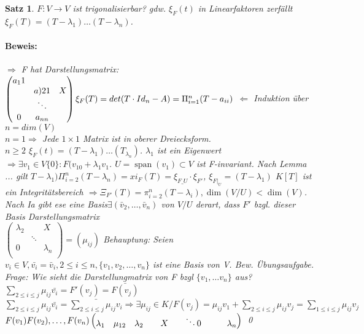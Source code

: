 \documentclass{report}
\newcommand{\lb}{\lambda}
\DeclareMathOperator{\Span}{span}
\theoremstyle{customrem}
\theoremstyle{customdef}
\newtheorem{satz}[definition]{Satz}
\renewenvironment{proof}{\paragraph{Beweis: }}{\qed}
\theoremstyle{customenv}
\begin{document}
\begin{satz}
  \(F : V \to V\) ist trigonalisierbar? gdw. \(\xi_F(t)\) in
  Linearfaktoren zerf\"allt \(\xi_F(T) = (T - \lb_1) \dots (T - \lb_n)\).
  
  \begin{proof}
    \(\Rightarrow\)
    F hat Darstellungsmatrix:\\
    \(
    \begin{pmatrix}
      a_11\\
           & a){21} & X\\
                    & \ddots\\
         0                     & a_{nn}\\
         
    \end{pmatrix}\\
    \xi_F(T) = det(T \cdot Id_n - A) = \Pi_{i=1}^n (T - a_{ii})
    \)
    \(\Leftarrow\)
    Induktion \"uber \(n = dim(V)\)\\
    \(n=1 \Rightarrow \) Jede \(1 \times 1\) Matrix ist in oberer Dreiecksform.\\
    \(n \ge 2\)  \(\xi_F(t) = (T - \lb_1) \dots (T_{\lb_n})\). \(\lb_1\) ist ein
    Eigenwert \( \Rightarrow \exists v_1 \in V\{0\} : F(v_10 + \lb_1 v_1\).
    \(U = \Span(v_1) \subset V\)  ist F-invariant. Nach Lemma ... gilt
    \(T - \lb_1) \Pi_{i=2}^n(T - \lb_n) = xi_F(T) = \xi_{F\_U} \cdot \xi_{F'}\), \(\xi_{F|_U} = (T - \lb_1)\)
    \(K[T]\) ist ein Integrit\"atsbereich \(\Rightarrow
    \Xi_{F'}(T) = \pi_{i=2}^n (T-\lb_i), \dim(V/U) < \dim(V)\).\\
    Nach Ia gibt ese eine Basis\(\exists (\bar{v}_2, \dots, \bar{v}_n)\) von
    \(V/U\) derart, dass \(F'\) bzgl. dieser Basis Darstellungsmatrix\\
    \(
    \begin{pmatrix}
      \lb_2 &        & X\\
            & \ddots &\\
      0     &        & \lb_n\\
    \end{pmatrix} = (\mu_{ij})
    \)
    Behauptung: Seien \(v_i \in V, \bar{v_i} = \bar{v}_i, 2 \le i \le n, \{v_1, v_2, \dots, v_n\}\) ist eine
    Basis von V. Bew. \"Ubungsaufgabe.\\
    Frage: Wie sieht die Darstellungmatrix von F bzgl \(\{v_1, \dots v_n\}\)
    aus?\\
    \(\sum_{2\le i \le j} \mu_{ij} \bar{v_i} = F'(v_j) = \bar{F(v_j)}\)\\
    \(\sum_{2\le i \le j} \mu_{ij} \bar{v_i} = \bar{\sum_{2\le i \le j} \mu_{ij} v_i}
    \Rightarrow \exists  \mu_{ij} \in K / F(v_j) = \mu_{ij}v_1 + \sum_{2 \le i \le j} \mu_{ij}v_j = \sum_{1 \le i \le j} \mu_{ij}v_j\)\\
    \(F(v_1) F(v_2), \dots, F(v_n)\\
    \begin{pmatrix}
    \lb_1 & \mu_{12}
          & \lb_2 &       & X
          &       & \ddots
    0     &       &       & \lb_n
    \end{pmatrix}
    \)
  \end{proof}
\end{satz}
\end{document}

